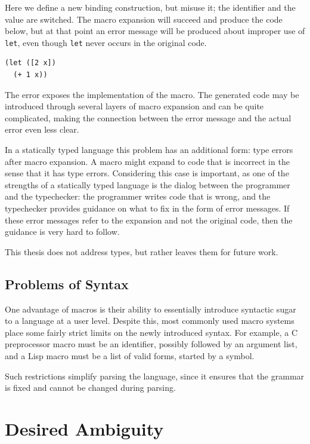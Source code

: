 \documentclass{kththesis}
\begin{document}
Here we define a new binding construction, but misuse it; the identifier and the value are switched. The macro expansion will succeed and produce the code below, but at that point an error message will be produced about improper use of \texttt{let}, even though \texttt{let} never occurs in the original code.

\begin{verbatim}
(let ([2 x])
  (+ 1 x))
\end{verbatim}

The error exposes the implementation of the macro. The generated code may be introduced through several layers of macro expansion and can be quite complicated, making the connection between the error message and the actual error even less clear.

In a statically typed language this problem has an additional form: type errors after macro expansion. A macro might expand to code that is incorrect in the sense that it has type errors. Considering this case is important, as one of the strengths of a statically typed language is the dialog between the programmer and the typechecker: the programmer writes code that is wrong, and the typechecker provides guidance on what to fix in the form of error messages. If these error messages refer to the expansion and not the original code, then the guidance is very hard to follow.

This thesis does not address types, but rather leaves them for future work.

\subsection{Problems of Syntax} \label{sec:problem-syntax}

One advantage of macros is their ability to essentially introduce syntactic sugar to a language at a user level. Despite this, most commonly used macro systems place some fairly strict limits on the newly introduced syntax. For example, a C preprocessor macro must be an identifier, possibly followed by an argument list, and a Lisp macro must be a list of valid forms, started by a symbol.

Such restrictions simplify parsing the language, since it ensures that the grammar is fixed and cannot be changed during parsing.

\section{Desired Ambiguity} \label{sec:desired-ambiguity}
\end{document}
